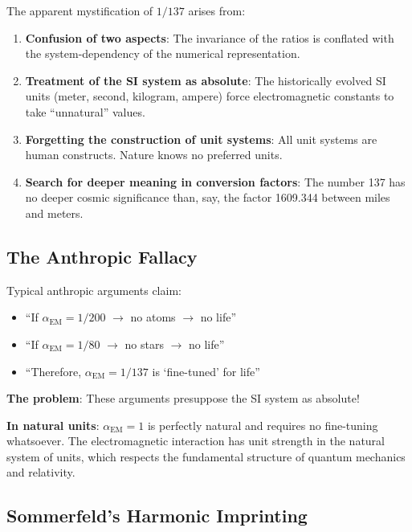 The apparent mystification of $1/137$ arises from:

\begin{enumerate}
	\item \textbf{Confusion of two aspects}: The invariance of the ratios is conflated with the system-dependency of the numerical representation.
	
	\item \textbf{Treatment of the SI system as absolute}: The historically evolved SI units (meter, second, kilogram, ampere) force electromagnetic constants to take ``unnatural'' values.
	
	\item \textbf{Forgetting the construction of unit systems}: All unit systems are human constructs. Nature knows no preferred units.
	
	\item \textbf{Search for deeper meaning in conversion factors}: The number 137 has no deeper cosmic significance than, say, the factor 1609.344 between miles and meters.
\end{enumerate}

\subsection{The Anthropic Fallacy}
\label{subsec:anthropic_fallacy}

Typical anthropic arguments claim:
\begin{itemize}
	\item ``If $\alpha_{\text{EM}} = 1/200$ $\rightarrow$ no atoms $\rightarrow$ no life''
	\item ``If $\alpha_{\text{EM}} = 1/80$ $\rightarrow$ no stars $\rightarrow$ no life''
	\item ``Therefore, $\alpha_{\text{EM}} = 1/137$ is `fine-tuned' for life''
\end{itemize}

\textbf{The problem}: These arguments presuppose the SI system as absolute!

\textbf{In natural units}: $\alpha_{\text{EM}} = 1$ is perfectly natural and requires no fine-tuning whatsoever. The electromagnetic interaction has unit strength in the natural system of units, which respects the fundamental structure of quantum mechanics and relativity.

\subsection{Sommerfeld's Harmonic Imprinting}
\label{subsec:sommerfeld_harmonic}

